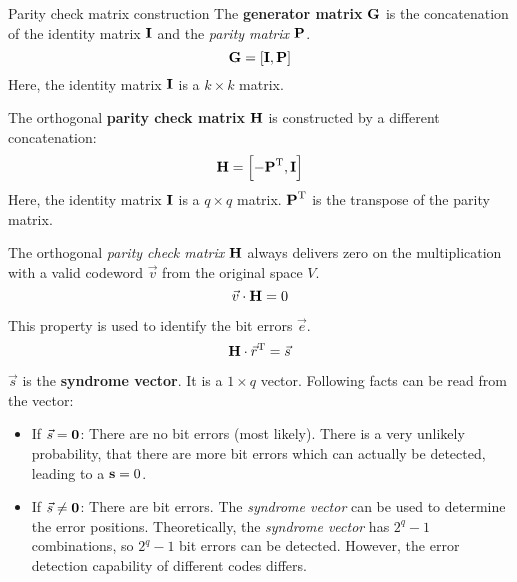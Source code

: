 \begin{refsection}
\begin{definition}{Parity check matrix construction}
	The  \textbf{generator matrix} $\bm{\mathrm{G}}$ is the concatenation of the identity matrix $\bm{\mathrm{\mathrm{I}}}$ and the \emph{parity matrix} $\bm{\mathrm{P}}$.
	\begin{equation}
		\bm{\mathrm{G}} = \left[\bm{\mathrm{\mathrm{I}}}, \bm{\mathrm{P}}\right]
	\end{equation}
	Here, the identity matrix $\bm{\mathrm{\mathrm{I}}}$ is a $k \times k$ matrix.
	
	\vspace{1em}

	The orthogonal  \textbf{parity check matrix} $\bm{\mathrm{H}}$ is constructed by a different concatenation:
	\begin{equation}
		\bm{\mathrm{H}} = \left[-\bm{\mathrm{P}}^{\mathrm{T}}, \bm{\mathrm{\mathrm{I}}}\right]
	\end{equation}
	Here, the identity matrix $\bm{\mathrm{\mathrm{I}}}$ is a $q \times q$ matrix. $\bm{\mathrm{P}}^{\mathrm{T}}$ is the transpose of the parity matrix.
\end{definition}

The orthogonal \emph{parity check matrix} $\bm{\mathrm{H}}$ always delivers zero on the multiplication with a valid codeword $\vec{v}$ from the original space $V$.
\begin{equation}
	\vec{v} \cdot \bm{\mathrm{H}} = 0
\end{equation}

This property is used to identify the bit errors $\vec{e}$.
\begin{equation}
	\bm{\mathrm{H}} \cdot \vec{r}^{\mathrm{T}} = \vec{s}
\end{equation}

$\vec{s}$ is the  \textbf{syndrome vector}. It is a $1 \times q$ vector. Following facts can be read from the vector:
\begin{itemize}
	\item If $\vec{s} = \bm{\mathrm{\mathrm{0}}}$: There are no bit errors (most likely). There is a very unlikely probability, that there are more bit errors which can actually be detected, leading to a $\bm{\mathrm{s}} = 0$.
	\item If $\vec{s} \neq \bm{\mathrm{\mathrm{0}}}$: There are bit errors. The \emph{syndrome vector} can be used to determine the error positions. Theoretically, the \emph{syndrome vector} has $2^q - 1$ combinations, so $2^q - 1$ bit errors can be detected. However, the error detection capability of different codes differs.
\end{itemize}


\end{refsection}
